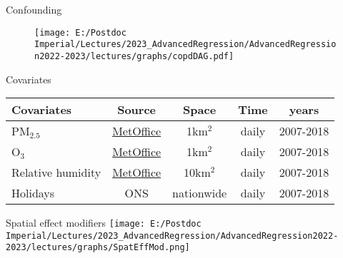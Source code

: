 \documentclass{beamer}
\begin{document}
\begin{frame}{Confounding}
	\vspace{-1cm}
	\begin{figure}
		\centering
		\texttt{[image: E:/Postdoc Imperial/Lectures/2023\_AdvancedRegression/AdvancedRegression2022-2023/lectures/graphs/copdDAG.pdf]}
	\end{figure}
	
\end{frame}

\begin{frame}{Covariates}
	\vspace{-0.5cm}
	\centering
	{\fontsize{9}{10}\selectfont
		\begin{table}[!t]
			\begin{tabular}{lcccc}
				\hline
				Covariates & Source & Space & Time & years \\ \hline
				PM$_{2.5}$ & \href{https://catalogue.ceda.ac.uk/uuid/4dc8450d889a491ebb20e724debe2dfb
				}{MetOffice} & 1km$^2$ & daily & 2007-2018\\
				O$_{3}$ & \href{https://catalogue.ceda.ac.uk/uuid/4dc8450d889a491ebb20e724debe2dfb
				}{MetOffice} & 1km$^2$ & daily & 2007-2018\\
				Relative humidity & \href{https://catalogue.ceda.ac.uk/uuid/4dc8450d889a491ebb20e724debe2dfb
				}{MetOffice} & 10km$^2$ & daily & 2007-2018\\
				Holidays & ONS & nationwide & daily & 2007-2018\\
				\hline
			\end{tabular}
		\end{table}
	}
	
\end{frame}

\begin{frame}{Spatial effect modifiers }
	\vspace{-0.5cm}
	\hspace{-0.7cm}
	\texttt{[image: E:/Postdoc Imperial/Lectures/2023\_AdvancedRegression/AdvancedRegression2022-2023/lectures/graphs/SpatEffMod.png]}
\end{frame}
\end{document}
